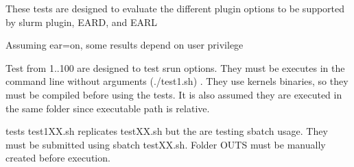 These tests are designed to evaluate the different plugin options to be supported by slurm plugin, E\+A\+RD, and E\+A\+RL
\begin{DoxyItemize}
\item Assuming ear=on, some results depend on user privilege
\item Test from 1..100 are designed to test srun options. They must be executes in the command line without arguments (./test1.sh) . They use kernels binaries, so they must be compiled before using the tests. It is also assumed they are executed in the same folder since executable path is relative.
\item tests test1\+X\+X.\+sh replicates test\+X\+X.\+sh but the are testing sbatch usage. They must be submitted using sbatch test\+X\+X.\+sh. Folder O\+U\+TS must be manually created before execution.
\end{DoxyItemize}

